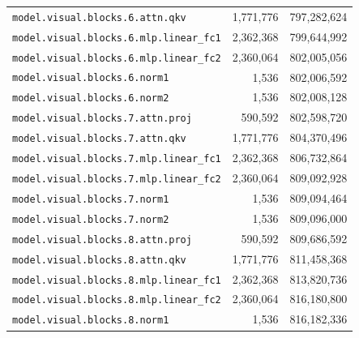 \documentclass[10pt,a4paper]{article}
\theoremstyle{definition}
\begin{document}
\begin{appendices}
\begin{longtable}{p{9.5cm}rr}
\texttt{model.\allowbreak{}visual.\allowbreak{}blocks.\allowbreak{}6.\allowbreak{}attn.\allowbreak{}qkv} & 1,771,776 & 797,282,624 \\
\texttt{model.\allowbreak{}visual.\allowbreak{}blocks.\allowbreak{}6.\allowbreak{}mlp.\allowbreak{}linear\_fc1} & 2,362,368 & 799,644,992 \\
\texttt{model.\allowbreak{}visual.\allowbreak{}blocks.\allowbreak{}6.\allowbreak{}mlp.\allowbreak{}linear\_fc2} & 2,360,064 & 802,005,056 \\
\texttt{model.\allowbreak{}visual.\allowbreak{}blocks.\allowbreak{}6.\allowbreak{}norm1} & 1,536 & 802,006,592 \\
\texttt{model.\allowbreak{}visual.\allowbreak{}blocks.\allowbreak{}6.\allowbreak{}norm2} & 1,536 & 802,008,128 \\
\texttt{model.\allowbreak{}visual.\allowbreak{}blocks.\allowbreak{}7.\allowbreak{}attn.\allowbreak{}proj} & 590,592 & 802,598,720 \\
\texttt{model.\allowbreak{}visual.\allowbreak{}blocks.\allowbreak{}7.\allowbreak{}attn.\allowbreak{}qkv} & 1,771,776 & 804,370,496 \\
\texttt{model.\allowbreak{}visual.\allowbreak{}blocks.\allowbreak{}7.\allowbreak{}mlp.\allowbreak{}linear\_fc1} & 2,362,368 & 806,732,864 \\
\texttt{model.\allowbreak{}visual.\allowbreak{}blocks.\allowbreak{}7.\allowbreak{}mlp.\allowbreak{}linear\_fc2} & 2,360,064 & 809,092,928 \\
\texttt{model.\allowbreak{}visual.\allowbreak{}blocks.\allowbreak{}7.\allowbreak{}norm1} & 1,536 & 809,094,464 \\
\texttt{model.\allowbreak{}visual.\allowbreak{}blocks.\allowbreak{}7.\allowbreak{}norm2} & 1,536 & 809,096,000 \\
\texttt{model.\allowbreak{}visual.\allowbreak{}blocks.\allowbreak{}8.\allowbreak{}attn.\allowbreak{}proj} & 590,592 & 809,686,592 \\
\texttt{model.\allowbreak{}visual.\allowbreak{}blocks.\allowbreak{}8.\allowbreak{}attn.\allowbreak{}qkv} & 1,771,776 & 811,458,368 \\
\texttt{model.\allowbreak{}visual.\allowbreak{}blocks.\allowbreak{}8.\allowbreak{}mlp.\allowbreak{}linear\_fc1} & 2,362,368 & 813,820,736 \\
\texttt{model.\allowbreak{}visual.\allowbreak{}blocks.\allowbreak{}8.\allowbreak{}mlp.\allowbreak{}linear\_fc2} & 2,360,064 & 816,180,800 \\
\texttt{model.\allowbreak{}visual.\allowbreak{}blocks.\allowbreak{}8.\allowbreak{}norm1} & 1,536 & 816,182,336 \\

\end{longtable}
\end{appendices}
\end{document}
